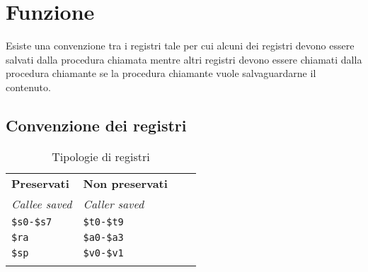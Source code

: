 \documentclass[../main.tex]{subfiles}
\begin{document}
\chapter{Funzione}
Esiste una convenzione tra i registri tale per cui alcuni dei registri
devono essere salvati dalla procedura chiamata mentre altri
registri devono essere chiamati dalla procedura chiamante se
la procedura chiamante vuole salvaguardarne il contenuto. \\

\section{Convenzione dei registri}
\begin{table}[h!]
    \centering

    \setlength{\tabcolsep}{12pt}
    \renewcommand{\arraystretch}{1.5}
    \begin{tabular}{ V{4} >{\centering\arraybackslash}p{4cm} | >{\centering\arraybackslash}p{4cm} V{4} }
        \textbf{Preservati} & \textbf{Non preservati} \\
        \hline
        \textit{Callee saved} & \textit{Caller saved} \\
        \texttt{\$s0-\$s7} & \texttt{\$t0-\$t9} \\
        \hline
        \texttt{\$ra} & \texttt{\$a0-\$a3} \\
        \hline
        \texttt{\$sp} & \texttt{\$v0-\$v1} \\
    \end{tabular}
    \caption{Tipologie di registri}
\end{table}
\end{document}
